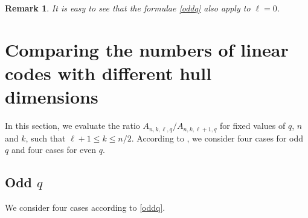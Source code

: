 \documentclass[a4paper,11pt]{article}
\newtheorem{remark}{Remark}
\begin{document}
\begin{remark} It is easy to see that the formulae \eqref{oddq} also apply to $\ell=0$.
\end{remark}



\section{Comparing the numbers of linear codes with different hull dimensions}
\label{sec:proofs}

In this section, we evaluate the ratio $A_{n,k,\ell,q}/A_{n,k,\ell+1,q}$ for fixed values of $q$, $n$ and $k$, such that $\ell+1\le k\le n/2$.
According to \cite{LiShiLing}, we consider four cases for odd $q$ and four cases for even $q$.

\subsection{Odd $q$}

We consider four cases according to \eqref{oddq}.
\end{document}
